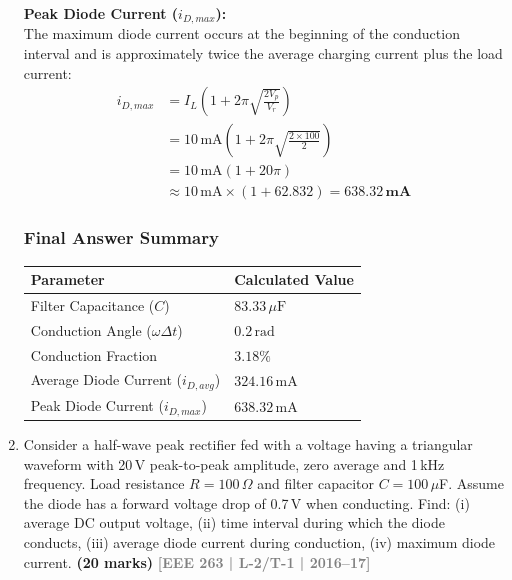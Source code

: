 \documentclass[12pt,a3paper]{article}
\newcommand{\yr}[1]{\hfill\textcolor{gray}{\small\textbf{[#1]}}}
\newcommand{\mk}[1]{\textcolor{orange!70!black}{\small\textbf{(#1 marks)}}}
\begin{document}
\begin{enumerate}
\begin{tcolorbox}[enhanced,breakable,ansbox,colback=cA!4,colframe=cA,boxrule=0.8pt,arc=5pt,title={\textbf{Answer}},fonttitle=\bfseries\color{white},colbacktitle=cA]
\textbf{Peak Diode Current ($i_{D,max}$):} \\
The maximum diode current occurs at the beginning of the conduction interval and is approximately twice the average charging current plus the load current:
\begin{align*}
    i_{D,max} &= I_L \left( 1 + 2\pi \sqrt{\frac{2V_p}{V_r}} \right) \\
    &= 10\,\text{mA} \left( 1 + 2\pi \sqrt{\frac{2 \times 100}{2}} \right) \\
    &= 10\,\text{mA} \left( 1 + 20\pi \right) \\
    &\approx 10\,\text{mA} \times (1 + 62.832) = \mathbf{638.32\,\text{mA}}
\end{align*}

\vspace{0.5em}
\hrulefill
\vspace{0.5em}

\subsubsection*{Final Answer Summary}
\begin{center}
\renewcommand{\arraystretch}{1.5}
\begin{tabular}{@{}ll@{}}
    \toprule
    \textbf{Parameter} & \textbf{Calculated Value} \\
    \midrule
    Filter Capacitance ($C$) & $83.33\,\mu\text{F}$ \\
    Conduction Angle ($\omega \Delta t$) & $0.2\,\text{rad}$ \\
    Conduction Fraction & $3.18\%$ \\
    Average Diode Current ($i_{D,avg}$) & $324.16\,\text{mA}$ \\
    Peak Diode Current ($i_{D,max}$) & $638.32\,\text{mA}$ \\
    \bottomrule
\end{tabular}
\end{center}

\end{tcolorbox}

\item Consider a half-wave peak rectifier fed with a voltage having a triangular waveform with 20\,V peak-to-peak amplitude, zero average and 1\,kHz frequency. Load resistance $R=100\,\Omega$ and filter capacitor $C=100\,\mu$F. Assume the diode has a forward voltage drop of 0.7\,V when conducting. Find: (i) average DC output voltage, (ii) time interval during which the diode conducts, (iii) average diode current during conduction, (iv) maximum diode current.
\mk{20} \yr{EEE 263 | L-2/T-1 | 2016--17}


\end{enumerate}
\end{document}

